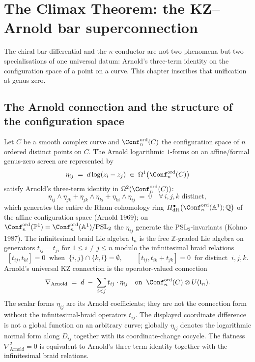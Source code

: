 \chapter{The Climax Theorem: the KZ--Arnold bar superconnection}
\label{ch:climax-theorem}

The chiral bar differential and the $\kappa$-conductor are not two
phenomena but two specialisations of one universal datum: Arnold's
three-term identity on the configuration space of a point on a curve.
This chapter inscribes that unification at genus zero.

\section{The Arnold connection and the structure of the configuration space}
\label{sec:climax-arnold-connection}

Let $C$ be a smooth complex curve and $\Conf_n^{\mathrm{ord}}(C)$ the
configuration space of $n$ ordered distinct points on $C$. The
Arnold logarithmic \(1\)-forms on an affine/formal genus-zero screen
are represented by
\[
 \eta_{ij} \;=\; d \log(z_i - z_j) \;\in\; \Omega^1\bigl(\Conf_n^{\mathrm{ord}}(C)\bigr)
\]
satisfy Arnold's three-term identity in $\Omega^2(\Conf_n^{\mathrm{ord}}(C))$:
\[
 \eta_{ij} \wedge \eta_{jk} + \eta_{jk} \wedge \eta_{ki} + \eta_{ki} \wedge \eta_{ij} \;=\; 0
 \quad \forall\, i, j, k \text{ distinct},
\]
which generates the entire de Rham cohomology ring $H^\bullet_{\mathrm{dR}}\bigl(\Conf_n^{\mathrm{ord}}(\mathbb{A}^1); \mathbb{Q}\bigr)$ of the affine configuration space \textup{(}Arnold 1969\textup{);} on $\Conf_n^{\mathrm{ord}}(\mathbb{P}^1) = \Conf_n^{\mathrm{ord}}(\mathbb{A}^1)/\mathrm{PSL}_2$ the $\eta_{ij}$ generate the $\mathrm{PSL}_2$-invariants (Kohno 1987). The infinitesimal braid Lie algebra
$\mathfrak{t}_n$ is the free $\mathbb{Z}$-graded Lie algebra on generators
$t_{ij} = t_{ji}$ for $1 \leq i \neq j \leq n$ modulo the infinitesimal
braid relations
\[
 [t_{ij}, t_{kl}] = 0 \;\;\text{when}\;\; \{i, j\} \cap \{k, l\} = \emptyset, \qquad
 [t_{ij}, t_{ik} + t_{jk}] = 0 \;\;\text{for distinct}\;\; i, j, k.
\]
Arnold's universal KZ connection is the operator-valued connection
\[
 \nabla_{\mathrm{Arnold}} \;=\; d \;-\; \sum_{i < j} t_{ij} \cdot \eta_{ij}
 \quad \text{on}\;\; \Conf_n^{\mathrm{ord}}(C) \otimes U(\mathfrak{t}_n).
\]
The scalar forms $\eta_{ij}$ are its Arnold coefficients; they are not
the connection form without the infinitesimal-braid operators $t_{ij}$.
The displayed coordinate difference is not a global function on an
arbitrary curve; globally \(\eta_{ij}\) denotes the logarithmic normal
form along \(D_{ij}\) together with its coordinate-change cocycle.
The flatness $\nabla_{\mathrm{Arnold}}^2 = 0$ is equivalent to Arnold's
three-term identity together with the infinitesimal braid relations.

